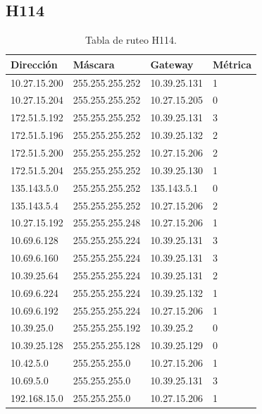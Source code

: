 \documentclass[12pt,titlepage]{article}
\begin{document}
\subsection{H114}
\begin{table}
  \begin{center}
    \begin{tabular}{|l|l|l|l|}
      \hline
        \bf{Direcci\'on} & \bf{M\'ascara} & \bf{Gateway} & \bf{M\'etrica} \\
      \hline 
	10.27.15.200  & 255.255.255.252 & 10.39.25.131 & 1 \\
        10.27.15.204  & 255.255.255.252 & 10.27.15.205 & 0 \\
        172.51.5.192  & 255.255.255.252 & 10.39.25.131 & 3 \\
        172.51.5.196  & 255.255.255.252 & 10.39.25.132 & 2 \\
        172.51.5.200  & 255.255.255.252 & 10.27.15.206 & 2 \\
        172.51.5.204  & 255.255.255.252 & 10.39.25.130 & 1 \\
        135.143.5.0   & 255.255.255.252 & 135.143.5.1 & 0 \\
        135.143.5.4   & 255.255.255.252 & 10.27.15.206 & 2 \\ 	
	10.27.15.192  & 255.255.255.248 & 10.27.15.206 & 1 \\
	10.69.6.128   & 255.255.255.224 & 10.39.25.131 & 3 \\
        10.69.6.160   & 255.255.255.224 & 10.39.25.131 & 3 \\
	10.39.25.64   & 255.255.255.224 & 10.39.25.131 & 2 \\       
	10.69.6.224   & 255.255.255.224 & 10.39.25.132 & 1 \\
	10.69.6.192   & 255.255.255.224 & 10.27.15.206 & 1 \\	
	10.39.25.0    & 255.255.255.192 & 10.39.25.2 & 0 \\
	10.39.25.128  & 255.255.255.128 & 10.39.25.129 & 0 \\
	10.42.5.0     & 255.255.255.0 & 10.27.15.206 & 1 \\
        10.69.5.0     & 255.255.255.0 & 10.39.25.131 & 3 \\
        192.168.15.0  & 255.255.255.0 & 10.27.15.206 & 1 \\  
    \hline
    \end{tabular} \\
  \end{center}
  \caption{Tabla de ruteo H114.}
\end{table}
\FloatBarrier
\end{document}
